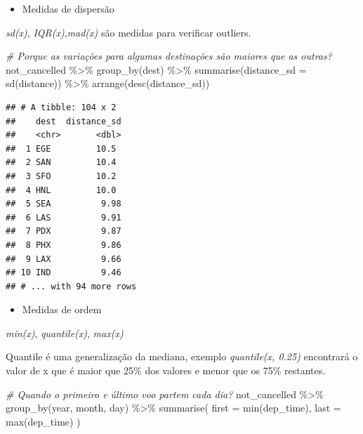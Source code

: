 \documentclass[
]{article}
\newenvironment{Shaded}{\begin{snugshade}}{\end{snugshade}}
\newcommand{\AttributeTok}[1]{\textcolor[rgb]{0.77,0.63,0.00}{#1}}
\newcommand{\CommentTok}[1]{\textcolor[rgb]{0.56,0.35,0.01}{\textit{#1}}}
\newcommand{\FunctionTok}[1]{\textcolor[rgb]{0.00,0.00,0.00}{#1}}
\newcommand{\NormalTok}[1]{#1}
\newcommand{\SpecialCharTok}[1]{\textcolor[rgb]{0.00,0.00,0.00}{#1}}
\providecommand{\tightlist}{%
  \setlength{\itemsep}{0pt}\setlength{\parskip}{0pt}}
\begin{document}
\begin{itemize}
\tightlist
\item
  Medidas de dispersão
\end{itemize}

\emph{sd(x)}, \emph{IQR(x)},\emph{mad(x)} são medidas para verificar
outliers.

\begin{Shaded}
\begin{Highlighting}[]
\CommentTok{\# Porque as variações para algumas destinações são maiores que as outras?}
\NormalTok{not\_cancelled }\SpecialCharTok{\%\textgreater{}\%} 
  \FunctionTok{group\_by}\NormalTok{(dest) }\SpecialCharTok{\%\textgreater{}\%} 
  \FunctionTok{summarise}\NormalTok{(}\AttributeTok{distance\_sd =} \FunctionTok{sd}\NormalTok{(distance)) }\SpecialCharTok{\%\textgreater{}\%} 
  \FunctionTok{arrange}\NormalTok{(}\FunctionTok{desc}\NormalTok{(distance\_sd))}
\end{Highlighting}
\end{Shaded}

\begin{verbatim}
## # A tibble: 104 x 2
##    dest  distance_sd
##    <chr>       <dbl>
##  1 EGE         10.5 
##  2 SAN         10.4 
##  3 SFO         10.2 
##  4 HNL         10.0 
##  5 SEA          9.98
##  6 LAS          9.91
##  7 PDX          9.87
##  8 PHX          9.86
##  9 LAX          9.66
## 10 IND          9.46
## # ... with 94 more rows
\end{verbatim}

\begin{itemize}
\tightlist
\item
  Medidas de ordem
\end{itemize}

\emph{min(x)}, \emph{quantile(x)}, \emph{max(x)}

Quantile é uma generalização da mediana, exemplo \emph{quantile(x,
0.25)} encontrará o valor de x que é maior que 25\% dos valores e menor
que os 75\% restantes.

\begin{Shaded}
\begin{Highlighting}[]
\CommentTok{\# Quando o primeiro e último voo partem cada dia?}
\NormalTok{not\_cancelled }\SpecialCharTok{\%\textgreater{}\%} 
  \FunctionTok{group\_by}\NormalTok{(year, month, day) }\SpecialCharTok{\%\textgreater{}\%} 
  \FunctionTok{summarise}\NormalTok{(}
    \AttributeTok{first =} \FunctionTok{min}\NormalTok{(dep\_time),}
    \AttributeTok{last =} \FunctionTok{max}\NormalTok{(dep\_time)}
\NormalTok{  )}
\end{Highlighting}
\end{Shaded}
\end{document}
